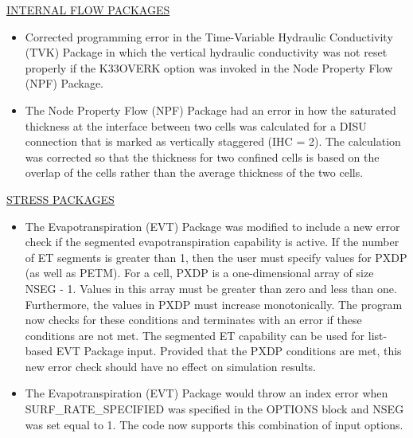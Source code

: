 	\underline{INTERNAL FLOW PACKAGES}
	\begin{itemize}
		\item Corrected programming error in the Time-Variable Hydraulic Conductivity (TVK) Package in which the vertical hydraulic conductivity was not reset properly if the K33OVERK option was invoked in the Node Property Flow (NPF) Package.
		\item The Node Property Flow (NPF) Package had an error in how the saturated thickness at the interface between two cells was calculated for a DISU connection that is marked as vertically staggered (IHC = 2).  The calculation was corrected so that the thickness for two confined cells is based on the overlap of the cells rather than the average thickness of the two cells.
	\end{itemize}

	\underline{STRESS PACKAGES}
	\begin{itemize}
		\item The Evapotranspiration (EVT) Package was modified to include a new error check if the segmented evapotranspiration capability is active.  If the number of ET segments is greater than 1, then the user must specify values for PXDP (as well as PETM).  For a cell, PXDP is a one-dimensional array of size NSEG - 1.  Values in this array must be greater than zero and less than one.  Furthermore, the values in PXDP must increase monotonically.  The program now checks for these conditions and terminates with an error if these conditions are not met.  The segmented ET capability can be used for list-based EVT Package input.  Provided that the PXDP conditions are met, this new error check should have no effect on simulation results.
		\item The Evapotranspiration (EVT) Package would throw an index error when SURF\_RATE\_SPECIFIED was specified in the OPTIONS block and NSEG was set equal to 1.  The code now supports this combination of input options.
	\end{itemize}

